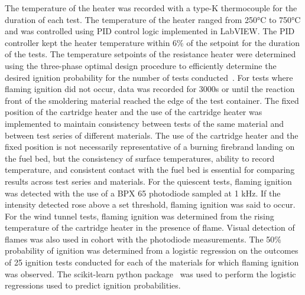    The temperature of the heater was recorded with a type-K thermocouple for the duration of each test. The temperature of the heater ranged from 250\si{\celsius} to 750\si{\celsius} and was controlled using PID control logic implemented in LabVIEW. The PID controller kept the heater temperature within 6\% of the setpoint for the duration of the tests. The temperature setpoints of the resistance heater were determined using the three-phase optimal design procedure to efficiently determine the desired ignition probability for the number of tests conducted~\cite{Wu2014}. For tests where flaming ignition did not occur, data was recorded for 3000\si{\second} or until the reaction front of the smoldering material reached the edge of the test container. The fixed position of the cartridge heater and the use of the cartridge heater was implemented to maintain consistency between tests of the same material and between test series of different materials. The use of the cartridge heater and the fixed position is not necessarily representative of a burning firebrand landing on the fuel bed, but the consistency of surface temperatures, ability to record temperature, and consistent contact with the fuel bed is essential for comparing results across test series and materials. For the quiescent tests, flaming ignition was detected with the use of a BPX 65 photodiode sampled at 1 kHz. If the intensity detected rose above a set threshold, flaming ignition was said to occur. For the wind tunnel tests, flaming ignition was determined from the rising temperature of the cartridge heater in the presence of flame. Visual detection of flames was also used in cohort with the photodiode measurements. The 50\% probability of ignition was determined from a logistic regression on the outcomes of 25 ignition tests conducted for each of the materials for which flaming ignition was observed. The scikit-learn python package~\cite{scikit-learn} was used to perform the logistic regressions used to predict ignition probabilities.
